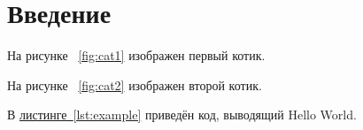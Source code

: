\section{Введение}

На рисунке ~\ref{fig:cat1} изображен первый котик.


На рисунке ~\ref{fig:cat2} изображен второй котик.


В \hyperref[lst:example]{листинге~\ref*{lst:example}}
приведён код, выводящий Hello World.

